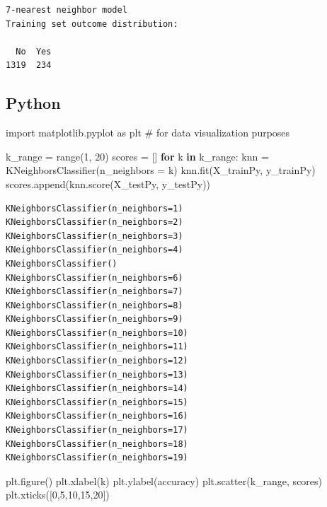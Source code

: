 \documentclass[
  letterpaper,
  DIV=11,
  numbers=noendperiod]{scrartcl}
\newenvironment{Shaded}{\begin{snugshade}}{\end{snugshade}}
\newcommand{\BuiltInTok}[1]{\textcolor[rgb]{0.00,0.23,0.31}{#1}}
\newcommand{\CommentTok}[1]{\textcolor[rgb]{0.37,0.37,0.37}{#1}}
\newcommand{\ControlFlowTok}[1]{\textcolor[rgb]{0.00,0.23,0.31}{\textbf{#1}}}
\newcommand{\DecValTok}[1]{\textcolor[rgb]{0.68,0.00,0.00}{#1}}
\newcommand{\ImportTok}[1]{\textcolor[rgb]{0.00,0.46,0.62}{#1}}
\newcommand{\KeywordTok}[1]{\textcolor[rgb]{0.00,0.23,0.31}{\textbf{#1}}}
\newcommand{\NormalTok}[1]{\textcolor[rgb]{0.00,0.23,0.31}{#1}}
\newcommand{\OperatorTok}[1]{\textcolor[rgb]{0.37,0.37,0.37}{#1}}
\newcommand{\StringTok}[1]{\textcolor[rgb]{0.13,0.47,0.30}{#1}}
\begin{document}
\begin{verbatim}
7-nearest neighbor model
Training set outcome distribution:

  No  Yes 
1319  234 
\end{verbatim}

\subsection{Python}

\begin{Shaded}
\begin{Highlighting}[]
\ImportTok{import}\NormalTok{ matplotlib.pyplot }\ImportTok{as}\NormalTok{ plt }\CommentTok{\# for data visualization purposes}

\NormalTok{k\_range }\OperatorTok{=} \BuiltInTok{range}\NormalTok{(}\DecValTok{1}\NormalTok{, }\DecValTok{20}\NormalTok{)}
\NormalTok{scores }\OperatorTok{=}\NormalTok{ []}
\ControlFlowTok{for}\NormalTok{ k }\KeywordTok{in}\NormalTok{ k\_range:}
\NormalTok{    knn }\OperatorTok{=}\NormalTok{ KNeighborsClassifier(n\_neighbors }\OperatorTok{=}\NormalTok{ k)}
\NormalTok{    knn.fit(X\_trainPy, y\_trainPy)}
\NormalTok{    scores.append(knn.score(X\_testPy, y\_testPy))}
\end{Highlighting}
\end{Shaded}

\begin{verbatim}
KNeighborsClassifier(n_neighbors=1)
KNeighborsClassifier(n_neighbors=2)
KNeighborsClassifier(n_neighbors=3)
KNeighborsClassifier(n_neighbors=4)
KNeighborsClassifier()
KNeighborsClassifier(n_neighbors=6)
KNeighborsClassifier(n_neighbors=7)
KNeighborsClassifier(n_neighbors=8)
KNeighborsClassifier(n_neighbors=9)
KNeighborsClassifier(n_neighbors=10)
KNeighborsClassifier(n_neighbors=11)
KNeighborsClassifier(n_neighbors=12)
KNeighborsClassifier(n_neighbors=13)
KNeighborsClassifier(n_neighbors=14)
KNeighborsClassifier(n_neighbors=15)
KNeighborsClassifier(n_neighbors=16)
KNeighborsClassifier(n_neighbors=17)
KNeighborsClassifier(n_neighbors=18)
KNeighborsClassifier(n_neighbors=19)
\end{verbatim}

\begin{Shaded}
\begin{Highlighting}[]
\NormalTok{plt.figure()}
\NormalTok{plt.xlabel(}\StringTok{\textquotesingle{}k\textquotesingle{}}\NormalTok{)}
\NormalTok{plt.ylabel(}\StringTok{\textquotesingle{}accuracy\textquotesingle{}}\NormalTok{)}
\NormalTok{plt.scatter(k\_range, scores)}
\NormalTok{plt.xticks([}\DecValTok{0}\NormalTok{,}\DecValTok{5}\NormalTok{,}\DecValTok{10}\NormalTok{,}\DecValTok{15}\NormalTok{,}\DecValTok{20}\NormalTok{])}
\end{Highlighting}
\end{Shaded}
\end{document}
